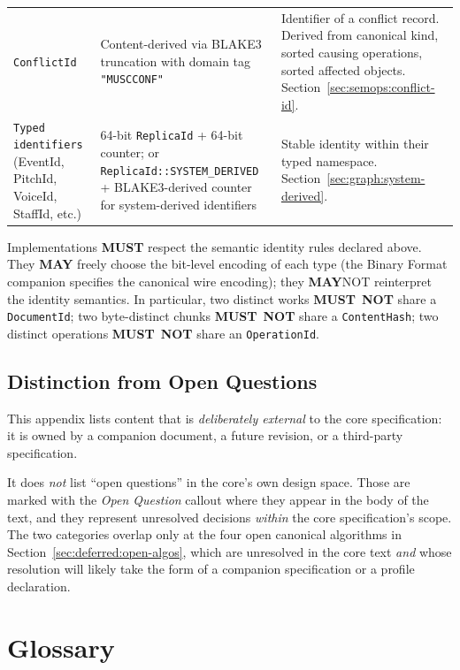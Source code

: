 \documentclass[11pt,letterpaper]{report}
\newcounter{requirement}[chapter]
\newcommand{\MUST}{\textbf{MUST}}
\newcommand{\MUSTNOT}{\textbf{MUST}\nobreak\ \textbf{NOT}}
\newcommand{\MAY}{\textbf{MAY}}
\begin{document}
\begin{longtable}{p{3.4cm} p{3.6cm} p{6.6cm}}
  \texttt{ConflictId} &
  Content-derived via BLAKE3 truncation with domain tag
  \texttt{"MUSCCONF"} &
  Identifier of a conflict record. Derived from canonical kind,
  sorted causing operations, sorted affected objects.
  Section~\ref{sec:semops:conflict-id}. \\

  \texttt{Typed identifiers} (EventId, PitchId, VoiceId,
  StaffId, etc.) &
  64-bit \texttt{ReplicaId} + 64-bit counter; or
  \texttt{ReplicaId::SYSTEM\_DERIVED} + BLAKE3-derived counter
  for system-derived identifiers &
  Stable identity within their typed namespace.
  Section~\ref{sec:graph:system-derived}. \\

  \bottomrule
\end{longtable}

\begin{requirement}
  \label{req:deferred:identity-semantics}
  Implementations \MUST{} respect the semantic identity rules
  declared above. They \MAY{} freely choose the bit-level
  encoding of each type (the Binary Format companion specifies
  the canonical wire encoding); they \MAY NOT{} reinterpret the
  identity semantics. In particular, two distinct works \MUSTNOT{}
  share a \texttt{DocumentId}; two byte-distinct chunks \MUSTNOT{}
  share a \texttt{ContentHash}; two distinct operations \MUSTNOT{}
  share an \texttt{OperationId}.
\end{requirement}

\section{Distinction from Open Questions}
\label{sec:deferred:vs-open}

This appendix lists content that is \emph{deliberately external}
to the core specification: it is owned by a companion document,
a future revision, or a third-party specification.

It does \emph{not} list ``open questions'' in the core's own
design space. Those are marked with the
\textsf{\textit{Open Question}} callout where they appear in
the body of the text, and they represent unresolved decisions
\emph{within} the core specification's scope. The two
categories overlap only at the four open canonical algorithms
in Section~\ref{sec:deferred:open-algos}, which are unresolved
in the core text \emph{and} whose resolution will likely take
the form of a companion specification or a profile declaration.

\chapter{Glossary}
\label{app:glossary}
\end{document}
